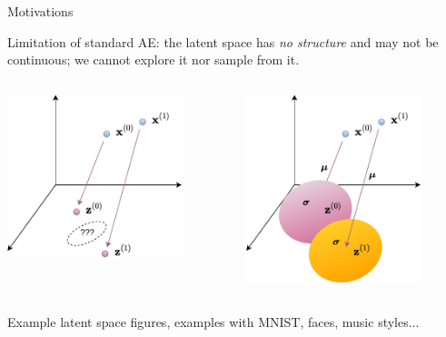 \documentclass{beamer}
\begin{document}
  \begin{frame}{Motivations}
    
    Limitation of standard AE: the latent space has \emph{no structure} and may not be continuous; we cannot explore it nor sample from it.

    \begin{columns}[T,onlytextwidth]
      \centering
      \includegraphics[width=0.8\textwidth]{rc/ae-latent}

      \centering
      \includegraphics[width=0.8\textwidth]{rc/vae-latent}
    \end{columns}

    Example latent space figures, examples with MNIST, faces, music styles...

  \end{frame}
\end{document}
